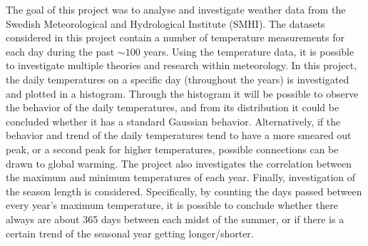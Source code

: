 The goal of this project was to analyse and investigate weather data from the Swedish Meteorological and Hydrological Institute (SMHI). The datasets considered in this project contain a number of temperature measurements for each day during the past $\sim100$ years. Using the temperature data, it is possible to investigate multiple theories and research within meteorology. 
\newline
In this project, the daily temperatures on a specific day (throughout the years) is investigated and plotted in a histogram. Through the histogram it will be possible to observe the behavior of the daily temperatures, and from its distribution it could be concluded whether it has a standard Gaussian behavior. Alternatively, if the behavior and trend of the daily temperatures tend to have a more smeared out peak, or a second peak for higher temperatures, possible connections can be drawn to global warming. The project also investigates the correlation between the maximum and minimum temperatures of each year. Finally, investigation of the season length is considered. Specifically, by counting the days passed between every year's maximum temperature, it is possible to conclude whether there always are about 365 days between each midst of the summer, or if there is a certain trend of the seasonal year getting longer/shorter.

